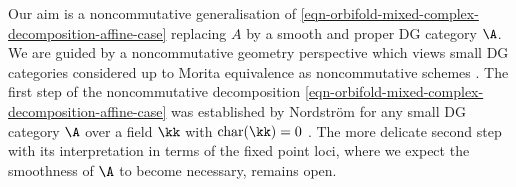 \documentclass[12pt,a4paper,reqno]{amsart}
\DeclareMathOperator{\chr}{char}
\begin{document}
Our aim is a noncommutative generalisation of 
\eqref{eqn-orbifold-mixed-complex-decomposition-affine-case} 
replacing $A$ by a smooth and proper DG category $\A$. We are guided 
by a noncommutative geometry perspective 
which views small DG categories considered up to Morita equivalence 
as noncommutative schemes
\cite{KontsevichSoibelman-NotesOnAInftyAlgebrasAInftyCategoriesAndNoncommutativeGeometry,KatzarkovKontsevichPantev-HodgeTheoreticAspectsOfMirrorSymmetry, 
Kaledin-HomologicalMethodsInNoncommutativeGeometry, 
Orlov-SmoothAndProperNoncommutativeSchemesAndGluingofDGcategories,
Efimov-HomotopyFinitenessOfSomeDGCategoriesFromAlgebraicGeometry}. 
The first step of the noncommutative decomposition 
\eqref{eqn-orbifold-mixed-complex-decomposition-affine-case}
was established by Nordstr\"om for any small DG category $\A$ over  
a field $\kk$ with $\chr(\kk) = 0$
\cite{Nordstrom-FiniteGroupActionsOnDGCategoriesAndHochschildHomology}. 
The more delicate second step with its interpretation in 
terms of the fixed point loci, where we expect the smoothness
of $\A$ to become necessary, remains open. 
\end{document}

